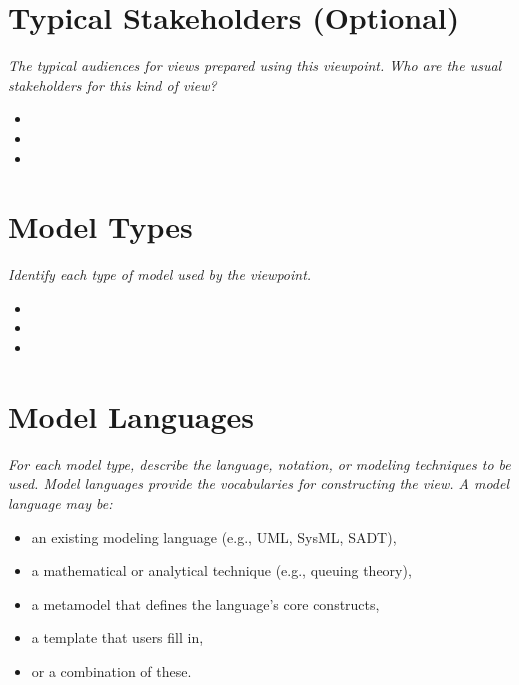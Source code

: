 \documentclass[11pt]{article}
\begin{document}
\vspace{4em}

\section*{Typical Stakeholders (Optional)}
\textit{The typical audiences for views prepared using this viewpoint. Who are
the usual stakeholders for this kind of view?}

\vspace{0.5em}
\begin{itemize}[nosep]
  \item
  \item
  \item
\end{itemize}

\vspace{2em}

\section*{Model Types}
\textit{Identify each type of model used by the viewpoint.}

\vspace{0.5em}
\begin{itemize}[nosep]
  \item
  \item
  \item
\end{itemize}

\vspace{2em}

\section*{Model Languages}
\textit{For each model type, describe the language, notation, or modeling
techniques to be used. Model languages provide the vocabularies for constructing
the view. A model language may be:}
\begin{itemize}[nosep]
  \item an existing modeling language (e.g., UML, SysML, SADT),
  \item a mathematical or analytical technique (e.g., queuing theory),
  \item a metamodel that defines the language’s core constructs,
  \item a template that users fill in,
  \item or a combination of these.
\end{itemize}
\end{document}
